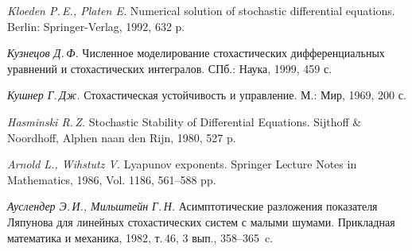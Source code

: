 \begin{thebibliography}{wlab}
\emph{Kloeden P.\,E., Platen E.}
\newblock Numerical solution of stochastic differential equations.
\newblock Berlin: Springer-Verlag, 1992, 632 p.

\emph{Кузнецов Д.\,Ф.}
\newblock Численное моделирование стохастических дифференциальных уравнений и стохастических интегралов.
\newblock СПб.: Наука, 1999, 459 с.

\emph{Кушнер Г.\,Дж.}
\newblock Стохастическая устойчивость и управление.
\newblock М.: Мир, 1969, 200 с.

\emph{Hasminski R.\,Z.}
\newblock Stochastic Stability of Differential Equations.
\newblock Sijthoff & Noordhoff, Alphen naan den Rijn, 1980, 527 p.

\emph{Arnold L., Wihstutz V.}
\newblock Lyapunov exponents.
\newblock Springer Lecture Notes in Mathematics, 1986, Vol. 1186, 561--588 pp.

\emph{Ауслендер Э.\,И., Мильштейн Г.\,Н.}
\newblock Асимптотические разложения показателя Ляпунова для линейных стохастических систем с малыми шумами.
\newblock Прикладная математика и механика, 1982, т.\,46, 3 вып., 358--365~c.

\end{thebibliography}

